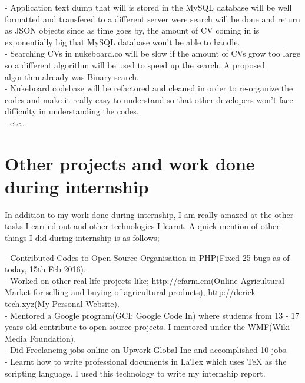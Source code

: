 - Application text dump that will is stored in the MySQL database will be well formatted and transfered to a different server were search will be done and return as JSON objects since as time goes by, the amount of CV coming in is exponentially big that MySQL database won't be able to handle.\\

- Searching CVs in nukeboard.co will be slow if the amount of CVs grow too large so a different algorithm will be used to speed up the search. A proposed algorithm already was Binary search. \\

- Nukeboard codebase will be refactored and cleaned in order to re-organize the codes and make it really easy to understand so that other developers won't face difficulty in understanding the codes. \\

- etc\ldots

\section{Other projects and work done during internship}

In addition to my work done during internship, I am really amazed at the other tasks I carried out and other technologies I learnt. A quick mention of other things I did during internship is as follows;

- Contributed Codes to Open Source Organisation in PHP(Fixed 25 bugs as of today, 15th Feb 2016). \\

- Worked on other real life projects like; http://efarm.cm(Online Agricultural Market for selling and buying of agricultural products), http://derick-tech.xyz(My Personal Website). \\

- Mentored a Google program(GCI: Google Code In) where students from 13 - 17 years old contribute to open source projects. I mentored under the WMF(Wiki Media Foundation). \\

- Did Freelancing jobs online on Upwork Global Inc and accomplished 10 jobs. \\

- Learnt how to write professional documents in LaTex which uses TeX as the scripting language. I used this technology to write my internship report.\\
